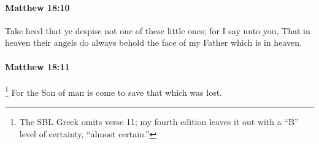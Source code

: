 		\paragraph{Matthew 18:10} %
			\label{MATTHEW-18-10}

			Take heed that ye despise not one of these little ones; for I say unto you, That in heaven their angels do always behold the face of my Father which is in heaven.

			\begin{framed}
			\scriptsize
				\begin{compactdesc}
					\item[SBLG] 
				\end{compactdesc}
			\end{framed}

		\paragraph{Matthew 18:11} %
			\label{MATTHEW-18-11}
				
				\footnote{%
					The SBL Greek omits verse 11; my fourth edition leaves it out with a ``B'' level of certainty, ``almost certain.''
					}%
			For the Son of man is come to save that which was lost.

